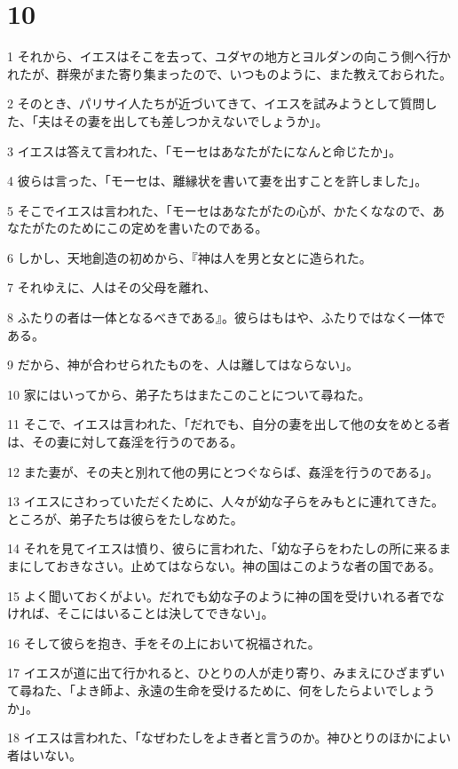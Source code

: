 \chapter{10}

\par 1 それから、イエスはそこを去って、ユダヤの地方とヨルダンの向こう側へ行かれたが、群衆がまた寄り集まったので、いつものように、また教えておられた。
\par 2 そのとき、パリサイ人たちが近づいてきて、イエスを試みようとして質問した、「夫はその妻を出しても差しつかえないでしょうか」。
\par 3 イエスは答えて言われた、「モーセはあなたがたになんと命じたか」。
\par 4 彼らは言った、「モーセは、離縁状を書いて妻を出すことを許しました」。
\par 5 そこでイエスは言われた、「モーセはあなたがたの心が、かたくななので、あなたがたのためにこの定めを書いたのである。
\par 6 しかし、天地創造の初めから、『神は人を男と女とに造られた。
\par 7 それゆえに、人はその父母を離れ、
\par 8 ふたりの者は一体となるべきである』。彼らはもはや、ふたりではなく一体である。
\par 9 だから、神が合わせられたものを、人は離してはならない」。
\par 10 家にはいってから、弟子たちはまたこのことについて尋ねた。
\par 11 そこで、イエスは言われた、「だれでも、自分の妻を出して他の女をめとる者は、その妻に対して姦淫を行うのである。
\par 12 また妻が、その夫と別れて他の男にとつぐならば、姦淫を行うのである」。
\par 13 イエスにさわっていただくために、人々が幼な子らをみもとに連れてきた。ところが、弟子たちは彼らをたしなめた。
\par 14 それを見てイエスは憤り、彼らに言われた、「幼な子らをわたしの所に来るままにしておきなさい。止めてはならない。神の国はこのような者の国である。
\par 15 よく聞いておくがよい。だれでも幼な子のように神の国を受けいれる者でなければ、そこにはいることは決してできない」。
\par 16 そして彼らを抱き、手をその上において祝福された。
\par 17 イエスが道に出て行かれると、ひとりの人が走り寄り、みまえにひざまずいて尋ねた、「よき師よ、永遠の生命を受けるために、何をしたらよいでしょうか」。
\par 18 イエスは言われた、「なぜわたしをよき者と言うのか。神ひとりのほかによい者はいない。
